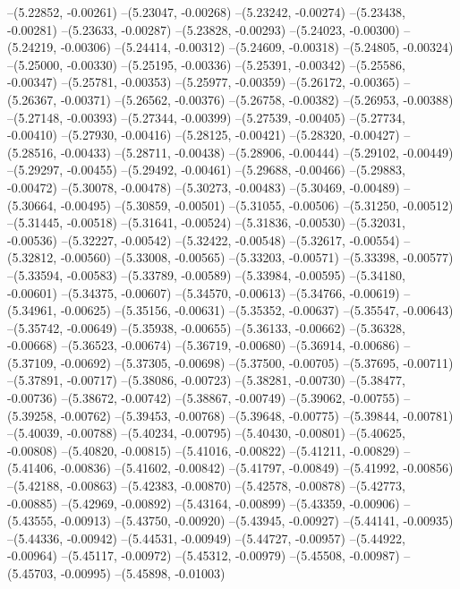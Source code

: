--(5.22852, -0.00261)
--(5.23047, -0.00268)
--(5.23242, -0.00274)
--(5.23438, -0.00281)
--(5.23633, -0.00287)
--(5.23828, -0.00293)
--(5.24023, -0.00300)
--(5.24219, -0.00306)
--(5.24414, -0.00312)
--(5.24609, -0.00318)
--(5.24805, -0.00324)
--(5.25000, -0.00330)
--(5.25195, -0.00336)
--(5.25391, -0.00342)
--(5.25586, -0.00347)
--(5.25781, -0.00353)
--(5.25977, -0.00359)
--(5.26172, -0.00365)
--(5.26367, -0.00371)
--(5.26562, -0.00376)
--(5.26758, -0.00382)
--(5.26953, -0.00388)
--(5.27148, -0.00393)
--(5.27344, -0.00399)
--(5.27539, -0.00405)
--(5.27734, -0.00410)
--(5.27930, -0.00416)
--(5.28125, -0.00421)
--(5.28320, -0.00427)
--(5.28516, -0.00433)
--(5.28711, -0.00438)
--(5.28906, -0.00444)
--(5.29102, -0.00449)
--(5.29297, -0.00455)
--(5.29492, -0.00461)
--(5.29688, -0.00466)
--(5.29883, -0.00472)
--(5.30078, -0.00478)
--(5.30273, -0.00483)
--(5.30469, -0.00489)
--(5.30664, -0.00495)
--(5.30859, -0.00501)
--(5.31055, -0.00506)
--(5.31250, -0.00512)
--(5.31445, -0.00518)
--(5.31641, -0.00524)
--(5.31836, -0.00530)
--(5.32031, -0.00536)
--(5.32227, -0.00542)
--(5.32422, -0.00548)
--(5.32617, -0.00554)
--(5.32812, -0.00560)
--(5.33008, -0.00565)
--(5.33203, -0.00571)
--(5.33398, -0.00577)
--(5.33594, -0.00583)
--(5.33789, -0.00589)
--(5.33984, -0.00595)
--(5.34180, -0.00601)
--(5.34375, -0.00607)
--(5.34570, -0.00613)
--(5.34766, -0.00619)
--(5.34961, -0.00625)
--(5.35156, -0.00631)
--(5.35352, -0.00637)
--(5.35547, -0.00643)
--(5.35742, -0.00649)
--(5.35938, -0.00655)
--(5.36133, -0.00662)
--(5.36328, -0.00668)
--(5.36523, -0.00674)
--(5.36719, -0.00680)
--(5.36914, -0.00686)
--(5.37109, -0.00692)
--(5.37305, -0.00698)
--(5.37500, -0.00705)
--(5.37695, -0.00711)
--(5.37891, -0.00717)
--(5.38086, -0.00723)
--(5.38281, -0.00730)
--(5.38477, -0.00736)
--(5.38672, -0.00742)
--(5.38867, -0.00749)
--(5.39062, -0.00755)
--(5.39258, -0.00762)
--(5.39453, -0.00768)
--(5.39648, -0.00775)
--(5.39844, -0.00781)
--(5.40039, -0.00788)
--(5.40234, -0.00795)
--(5.40430, -0.00801)
--(5.40625, -0.00808)
--(5.40820, -0.00815)
--(5.41016, -0.00822)
--(5.41211, -0.00829)
--(5.41406, -0.00836)
--(5.41602, -0.00842)
--(5.41797, -0.00849)
--(5.41992, -0.00856)
--(5.42188, -0.00863)
--(5.42383, -0.00870)
--(5.42578, -0.00878)
--(5.42773, -0.00885)
--(5.42969, -0.00892)
--(5.43164, -0.00899)
--(5.43359, -0.00906)
--(5.43555, -0.00913)
--(5.43750, -0.00920)
--(5.43945, -0.00927)
--(5.44141, -0.00935)
--(5.44336, -0.00942)
--(5.44531, -0.00949)
--(5.44727, -0.00957)
--(5.44922, -0.00964)
--(5.45117, -0.00972)
--(5.45312, -0.00979)
--(5.45508, -0.00987)
--(5.45703, -0.00995)
--(5.45898, -0.01003)
